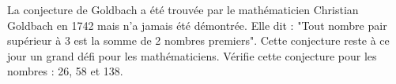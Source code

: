 
La conjecture de Goldbach a été trouvée par le mathématicien Christian Goldbach en 1742 mais n'a jamais été démontrée. Elle dit : "Tout nombre pair supérieur à 3 est la somme de 2 nombres premiers". Cette conjecture reste à ce jour un grand défi pour les mathématiciens.
Vérifie cette conjecture pour les nombres : 26, 58 et 138.
